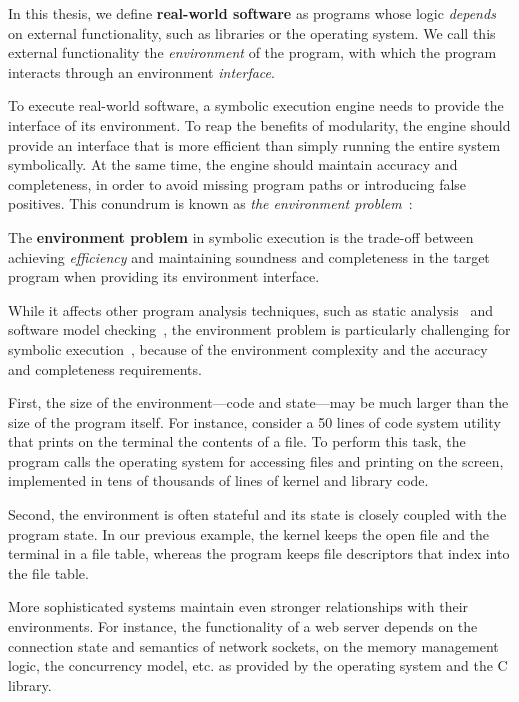 \begin{framed}
  In this thesis, we define \textbf{real-world software} as programs whose logic \emph{depends} on external functionality, such as libraries or the operating system.
  We call this external functionality the \emph{environment} of the program, with which the program interacts through an environment \emph{interface}.
\end{framed}

To execute real-world software, a symbolic execution engine needs to provide the interface of its environment.
%
To reap the benefits of modularity, the engine should provide an interface that is more efficient than simply running the entire system symbolically.
%
At the same time, the engine should maintain accuracy and completeness, in order to avoid missing program paths or introducing false positives.  This conundrum is known as \emph{the environment problem}~\cite{klee}:

\begin{framed}
  The \textbf{environment problem} in symbolic execution is the trade-off between achieving \emph{efficiency} and maintaining soundness and completeness in the target program when providing its environment interface.
\end{framed}

While it affects other program analysis techniques, such as static analysis~\cite{slam-project} and software model checking~\cite{visser-jpf}, the environment problem is particularly challenging for symbolic execution~\cite{klee,unit-system}, because of the environment complexity and the accuracy and completeness requirements.

First, the size of the environment---code and state---may be much larger than the size of the program itself.
%
For instance, consider a 50 lines of code system utility that prints on the terminal the contents of a file.  To perform this task, the program calls the operating system for accessing files and printing on the screen, implemented in tens of thousands of lines of kernel and library code.

Second, the environment is often stateful and its state is closely coupled with the program state.
%
In our previous example, the kernel keeps the open file and the terminal in a file table, whereas the program keeps file descriptors that index into the file table.

More sophisticated systems maintain even stronger relationships with their environments.
%
For instance, the functionality of a web server depends on the connection state and semantics of network sockets, on the memory management logic, the concurrency model, etc. as provided by the operating system and the C library.

